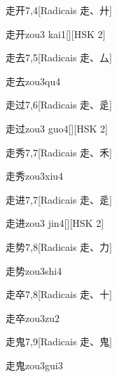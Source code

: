 \begin{entry}{走开}{7,4}[Radicais ⾛、⼶]
  \begin{phonetics}{走开}{zou3 kai1}[][HSK 2]
  \end{phonetics}
\end{entry}

\begin{entry}{走去}{7,5}[Radicais ⾛、⼛]
  \begin{phonetics}{走去}{zou3qu4}
  \end{phonetics}
\end{entry}

\begin{entry}{走过}{7,6}[Radicais ⾛、⾡]
  \begin{phonetics}{走过}{zou3 guo4}[][HSK 2]
  \end{phonetics}
\end{entry}

\begin{entry}{走秀}{7,7}[Radicais ⾛、⽲]
  \begin{phonetics}{走秀}{zou3xiu4}
  \end{phonetics}
\end{entry}

\begin{entry}{走进}{7,7}[Radicais ⾛、⾡]
  \begin{phonetics}{走进}{zou3 jin4}[][HSK 2]
  \end{phonetics}
\end{entry}

\begin{entry}{走势}{7,8}[Radicais ⾛、⼒]
  \begin{phonetics}{走势}{zou3shi4}
  \end{phonetics}
\end{entry}

\begin{entry}{走卒}{7,8}[Radicais ⾛、⼗]
  \begin{phonetics}{走卒}{zou3zu2}
  \end{phonetics}
\end{entry}

\begin{entry}{走鬼}{7,9}[Radicais ⾛、⿁]
  \begin{phonetics}{走鬼}{zou3gui3}
  \end{phonetics}
\end{entry}

